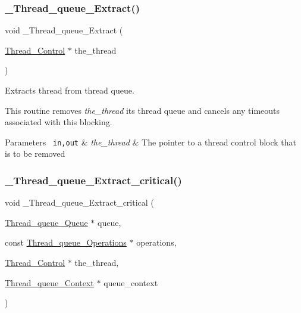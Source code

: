 \subsubsection{\texorpdfstring{\_Thread\_queue\_Extract()}{\_Thread\_queue\_Extract()}}
{\footnotesize\ttfamily void \+\_\+\+Thread\+\_\+queue\+\_\+\+Extract (\begin{DoxyParamCaption}\item[{\mbox{\hyperlink{struct__Thread__Control}{Thread\+\_\+\+Control}} $\ast$}]{the\+\_\+thread }\end{DoxyParamCaption})}



Extracts thread from thread queue. 

This routine removes {\itshape the\+\_\+thread} its thread queue and cancels any timeouts associated with this blocking.


\begin{DoxyParams}[1]{Parameters}
\mbox{\texttt{ in,out}}  & {\em the\+\_\+thread} & The pointer to a thread control block that is to be removed \\
\hline
\end{DoxyParams}
\mbox{\label{group__RTEMSScoreThreadQueue_gaf6ce2524fef09fe93a24196dd392093e}} 
\subsubsection{\texorpdfstring{\_Thread\_queue\_Extract\_critical()}{\_Thread\_queue\_Extract\_critical()}}
{\footnotesize\ttfamily void \+\_\+\+Thread\+\_\+queue\+\_\+\+Extract\+\_\+critical (\begin{DoxyParamCaption}\item[{\mbox{\hyperlink{structThread__queue__Queue}{Thread\+\_\+queue\+\_\+\+Queue}} $\ast$}]{queue,  }\item[{const \mbox{\hyperlink{structThread__queue__Operations}{Thread\+\_\+queue\+\_\+\+Operations}} $\ast$}]{operations,  }\item[{\mbox{\hyperlink{struct__Thread__Control}{Thread\+\_\+\+Control}} $\ast$}]{the\+\_\+thread,  }\item[{\mbox{\hyperlink{structThread__queue__Context}{Thread\+\_\+queue\+\_\+\+Context}} $\ast$}]{queue\+\_\+context }\end{DoxyParamCaption})}



